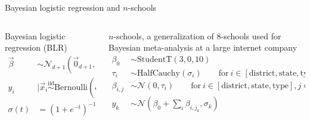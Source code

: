 \documentclass[final]{beamer}
\newlength{\twocolwid}
\newcommand{\cN}{\mathcal{N}}
\newcommand{\vx}{\vec{x}}
\newcommand{\simiid}{\overset{\text{iid}}{\sim}}
\DeclareMathOperator{\diag}{diag}
\begin{document}
\begin{frame}[t,containsverbatim]
\begin{columns}[t]
\begin{column}{\twocolwid}
      \begin{block}{Bayesian logistic regression and $n$-schools}
        \begin{columns}[t]
          \begin{column}{0.5\textwidth}
            Bayesian logistic regression (BLR)
            \newline
            \begin{align*}
              \vec{\beta} & \sim \cN_{d+1}(\vec{0}_{d+1}, \diag(10, 2.5\vec{1}_{d}))            \\
              y_i         & \mid \vx_i \simiid \text{Bernoulli}(\sigma(\vec{\beta}^\top \vx_i)) \\
              \sigma(t)   & = (1 + e^{-t})^{-1}
            \end{align*}
          \end{column}
          \begin{column}{0.5\textwidth}
            $n$-schools, a generalization of $8$-schools \cite{rubin1981estimation}
            used for Bayesian meta-analysis at a large internet company
            \begin{align*}
              \beta_0     & \sim \text{StudentT}(3, 0, 10)                                                                         \\
              \tau_{i}    & \sim \text{HalfCauchy}(\sigma_i) \qquad \text{for}~i \in [\text{district}, \text{state}, \text{type}]  \\
              \beta_{i,j} & \sim \cN(0, \tau_i)  \qquad \text{for}~i \in [\text{district}, \text{state}, \text{type}], j \in [n_i] \\
              y_k         & \sim \cN(\beta_0 + \sum_i \beta_{i,j_k}, \sigma_k)
            \end{align*}
          \end{column}
        \end{columns}


\end{block}
\end{column}
\end{columns}
\end{frame}
\end{document}
